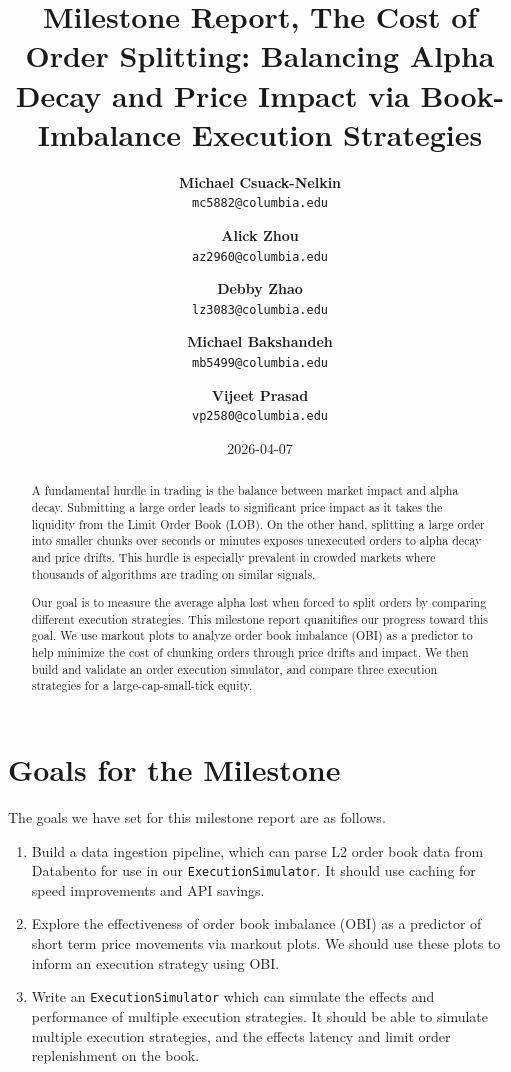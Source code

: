 \documentclass[
  letterpaper,
]{article}
\title{Milestone Report, The Cost of Order Splitting: Balancing Alpha
Decay and Price Impact via Book-Imbalance Execution Strategies}
\author{
\textbf{Michael Csuack-Nelkin}%
\\%
%
\texttt{mc5882@columbia.edu}\and 
\textbf{Alick Zhou}%
\\%
%
\texttt{az2960@columbia.edu}\and 
\textbf{Debby Zhao}%
\\%
%
\texttt{lz3083@columbia.edu}\and 
\textbf{Michael Bakshandeh}%
\\%
%
\texttt{mb5499@columbia.edu}\and 
\textbf{Vijeet Prasad}%
\\%
%
\texttt{vp2580@columbia.edu}}
\date{2026-04-07}
\providecommand{\tightlist}{%
  \setlength{\itemsep}{0pt}\setlength{\parskip}{0pt}}
\begin{document}
\maketitle
\begin{abstract}
A fundamental hurdle in trading is the balance between market impact and
alpha decay. Submitting a large order leads to significant price impact
as it takes the liquidity from the Limit Order Book (LOB). On the other
hand, splitting a large order into smaller chunks over seconds or
minutes exposes unexecuted orders to alpha decay and price drifts. This
hurdle is especially prevalent in crowded markets where thousands of
algorithms are trading on similar signals.

Our goal is to measure the average alpha lost when forced to split
orders by comparing different execution strategies. This milestone
report quanitifies our progress toward this goal. We use markout plots
to analyze order book imbalance (OBI) as a predictor to help minimize
the cost of chunking orders through price drifts and impact. We then
build and validate an order execution simulator, and compare three
execution strategies for a large-cap-small-tick equity.
\end{abstract}


\section{Goals for the Milestone}\label{goals-for-the-milestone}

The goals we have set for this milestone report are as follows.

\begin{enumerate}
\def\labelenumi{\arabic{enumi}.}
\tightlist
\item
  Build a data ingestion pipeline, which can parse L2 order book data
  from Databento for use in our \texttt{ExecutionSimulator}. It should
  use caching for speed improvements and API savings.
\item
  Explore the effectiveness of order book imbalance (OBI) as a predictor
  of short term price movements via markout plots. We should use these
  plots to inform an execution strategy using OBI.
\item
  Write an \texttt{ExecutionSimulator} which can simulate the effects
  and performance of multiple execution strategies. It should be able to
  simulate multiple execution strategies, and the effects latency and
  limit order replenishment on the book.
\end{enumerate}
\end{document}
